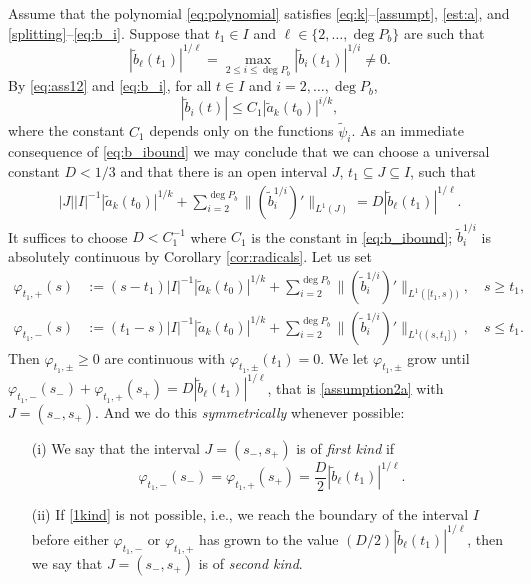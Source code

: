 \documentclass[12pt]{amsart}
\theoremstyle{plain}
\theoremstyle{definition}
\numberwithin{equation}{section}
\begin{document}
Assume that the polynomial \eqref{eq:polynomial} satisfies \eqref{eq:k}--\eqref{assumpt}, \eqref{est:a}, and \eqref{splitting}--\eqref{eq:b_i}.
Suppose that $t_1 \in I$ and $\ell \in \{2,\ldots,\deg P_b\}$ are such that  
\begin{equation} \label{eq:ell}
  |\tilde b_\ell(t_1)|^{1/\ell} = \max_{2 \le i \le \deg P_b} |\tilde b_i(t_1)|^{1 /i} \ne 0.
\end{equation}
By \eqref{eq:ass12} and \eqref{eq:b_i}, for all $t \in I$ and $i = 2,\ldots,\deg P_b$,
      \begin{equation} \label{eq:b_ibound}
|\tilde b_i(t) | \le C_1  |\tilde a_k (t_0)|^{i/k},   
  \end{equation}
where the constant $C_1$ depends only on the functions $\tilde {\psi}_i$.
As an immediate consequence of \eqref{eq:b_ibound} we may conclude that we can choose  
a universal constant $D< 1/3$ and that there is an open interval $J$, $t_1 \subseteq J \subseteq I$, such that 
\begin{align}\label{assumption2a}
  | J|  |I|^{-1}  {|\tilde a_k(t_0)|^{1/k}}  + \sum_{i=2}^{\deg P_b} \|(\tilde b _i^{1/i})'\|_{L^1 (J)} =  D |\tilde b_\ell(t_1)|^{1/\ell} .
\end{align}
It suffices to choose $D < C_1^{-1}$ where $C_1$ is the constant in \eqref{eq:b_ibound}; $\tilde b _i^{1/i}$ is absolutely continuous 
by Corollary \ref{cor:radicals}. 
Let us set 
\begin{align*}
  {\varphi}_{t_1,+}(s) &:= (s-t_1) |I|^{-1} {|\tilde a_k(t_0)|^{1/k}}  + \sum_{i=2}^{\deg P_b} \|(\tilde b _i^{1/i})'\|_{L^1 ([t_1,s))}, \quad s\ge t_1, \\
  {\varphi}_{t_1,-}(s) &:= (t_1-s) |I|^{-1} {|\tilde a_k(t_0)|^{1/k}}  + \sum_{i=2}^{\deg P_b} \|(\tilde b _i^{1/i})'\|_{L^1 ((s,t_1])}, \quad s\le t_1. 
\end{align*}
Then ${\varphi}_{t_1,\pm} \ge 0$ are continuous with ${\varphi}_{t_1,\pm}(t_1) = 0$. We let ${\varphi}_{t_1,\pm}$ grow until 
${\varphi}_{t_1,-}(s_-) + {\varphi}_{t_1,+}(s_+) = D |\tilde b_\ell(t_1)|^{1/\ell}$, that is \eqref{assumption2a} with $J=(s_-,s_+)$. And we do this 
\emph{symmetrically} whenever possible:  
\begin{enumerate}
   \item[(i)] We say that the interval $J=(s_-,s_+)$ is of \emph{first kind} if 
   \begin{equation} \label{1kind}
     {\varphi}_{t_1,-}(s_-) = {\varphi}_{t_1,+}(s_+) = \frac D 2|\tilde b_\ell(t_1)|^{1/\ell}.
   \end{equation}
   \item[(ii)] If \eqref{1kind} is not possible, i.e., we reach the boundary of the interval $I$ before either ${\varphi}_{t_1,-}$ or ${\varphi}_{t_1,+}$ has 
   grown to the value $(D/2)|\tilde b_\ell(t_1)|^{1/\ell}$, then we say that $J=(s_-,s_+)$ is of \emph{second kind}.  
\end{enumerate} 
\end{document}
